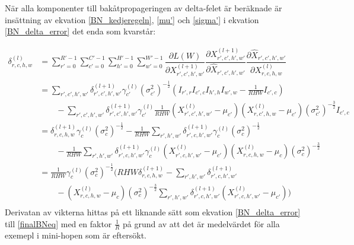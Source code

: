 \documentclass[a4paper,11pt,twoside]{article}
\newcommand*{\pd}[2]{\ensuremath{\dfrac{\partial #1}{\partial #2}}}
\begin{document}
När alla komponenter till bakåtpropageringen av delta-felet är beräknade är insättning av ekvation \eqref{BN_kedjeregeln}, \eqref{mu'} och \eqref{sigma'} i ekvation \eqref{BN_delta_error} det enda som kvarstår:

\begin{equation}\label{finalBNeq}
\begin{split}
	\delta^{(l)}_{r,c,h,w} 
	& = \sum^{R'-1}_{r'=0} \sum^{C'-1}_{c'=0} \sum^{H'-1}_{h'=0} \sum^{W'-1}_{w'=0} \pd{L(W)}{X^{(l+1)}_{r',c',h',w'}} \pd{X^{(l+1)}_{r',c',h',w'}}{\hat{X}_{r',c',h',w'}} \pd{\hat{X}_{r',c',h',w'}}{{X}^{(l)}_{r,c,h,w}}\\
	& = \sum\limits_{r',c',h',w'}\delta^{(l+1)}_{r',c',h',w'} \gamma^{(l)}_{c'} {(\sigma^2_{c'})}^{-\frac{1}{2}} (I_{r',r} I_{c',c} I_{h',h} I_{w',w} - \frac{1}{RHW} I_{c',c}) \\
	& \qquad -\sum\limits_{r',c',h',w'}\delta^{(l+1)}_{r',c',h',w'} \gamma^{(l)}_{c'} \frac{1}{RHW} ({X^{(l)}_{r',c',h',w'} - \mu_{c'}})({X^{(l)}_{r,c',h,w} - \mu_{c'}}) {(\sigma^2_{c'})}^{-\frac{3}{2}} I_{c',c} \\
	& = \delta^{(l+1)}_{r,c,h,w} \gamma^{(l)}_{c} {(\sigma^2_{c})}^{-\frac{1}{2}} - \frac{1}{RHW} \sum\limits_{r',h',w'} \delta^{(l+1)}_{r',c,h',w'} \gamma^{(l)}_{c} {(\sigma^2_{c})}^{-\frac{1}{2}}\\
	& \qquad - \frac{1}{RHW} \sum\limits_{r',h',w'} \delta^{(l+1)}_{r',c,h',w'}\gamma^{(l)}_{c} ({X^{(l)}_{r',c,h',w'} - \mu_{c'}})({X^{(l)}_{r,c,h,w} - \mu_{c}}){(\sigma^2_{c})}^{-\frac{3}{2}} \\
	& = \frac{1}{RHW} \gamma^{(l)}_c {(\sigma^2_{c})}^{-\frac{1}{2}} \biggl(    RHW \delta^{(l+1)}_{r,c,h,w} -  \sum\limits_{r',h',w'} \delta^{(l+1)}_{r',c,h',w'} \qquad \\
	& \qquad -  ({X^{(l)}_{r,c,h,w} - \mu_{c}}) {(\sigma^2_{c})}^{-\frac{3}{2}} \sum\limits_{r',h',w'} \delta^{(l+1)}_{r',c,h',w'} ({X^{(l)}_{r',c,h',w'} - \mu_{c'}}) \biggl) \\
\end{split}
\end{equation}
Derivatan av vikterna hittas på ett liknande sätt som ekvation \eqref{BN_delta_error} till \eqref{finalBNeq} med en faktor $\frac{1}{R}$ på grund av att det är medelvärdet för alla exemepl i mini-hopen som är eftersökt. \cite{webBN1} \cite{webBN2}
\end{document}

